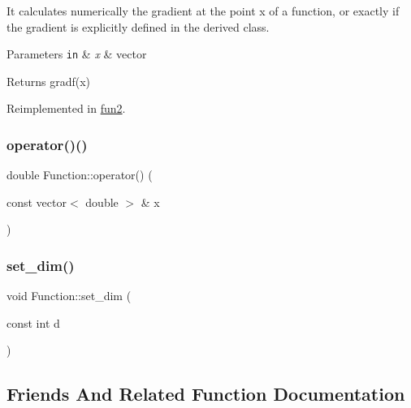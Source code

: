 It calculates numerically the gradient at the point x of a function, or exactly if the gradient is explicitly defined in the derived class. 


\begin{DoxyParams}[1]{Parameters}
\mbox{\tt in}  & {\em x} & vector \\
\hline
\end{DoxyParams}
\begin{DoxyReturn}{Returns}
gradf(x) 
\end{DoxyReturn}


Reimplemented in \hyperlink{classfun2_ae8465662c95bd065f993853609277e9b}{fun2}.

\mbox{\label{class_function_ae890d237648f6320730436a66920a6e7}} 
\subsubsection{\texorpdfstring{operator()()}{operator()()}}
{\footnotesize\ttfamily double Function\+::operator() (\begin{DoxyParamCaption}\item[{const vector$<$ double $>$ \&}]{x }\end{DoxyParamCaption})}

\mbox{\label{class_function_a62de0ce683667593f68559566e35726f}} 
\subsubsection{\texorpdfstring{set\+\_\+dim()}{set\_dim()}}
{\footnotesize\ttfamily void Function\+::set\+\_\+dim (\begin{DoxyParamCaption}\item[{const int}]{d }\end{DoxyParamCaption})}



\subsection{Friends And Related Function Documentation}
\mbox{\label{class_function_a52e0aa61f3f38c1b981ad4c1deeebed5}} 

